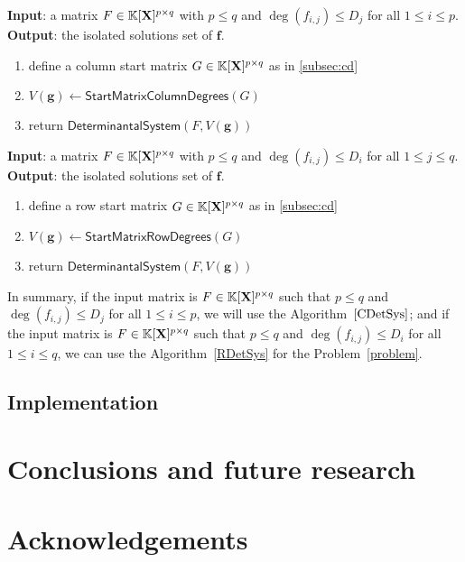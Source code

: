 \documentclass[11pt]{article}
\numberwithin{Property}{section}
\numberwithin{Theorem}{section}
\numberwithin{Proposition}{section}
\numberwithin{Lemma}{section}
\numberwithin{Corollary}{section}
\numberwithin{Definition}{section}
\numberwithin{Remark}{section}
\numberwithin{Conjecture}{section}
\numberwithin{Problem}{section}
\numberwithin{Claim}{section}
\theoremstyle{definition}
\numberwithin{Example}{section}
\def\f {\ensuremath{\mathbf{f}}}
\def\g {\ensuremath{\mathbf{g}}}
\renewcommand{\leq}{\leqslant}
\newcommand{\field}{\mathbb{K}} %
\newcommand{\mat}[1]{\mathbf{\MakeUppercase{#1}}} %
\begin{document}
\begin{algorithm}
\caption{$\mathsf{ColumnDeterminantal System}$}
\label{CDetSys}
{\bf Input}: a matrix $F \in \field[\mat{X}]^{p \times q}$ with $p \leq q$ and $\deg(f_{i,j}) \leq D_j$ for all $1 \leq i \leq p$.\\
{\bf Output}: the isolated solutions set of $\f$. 
\begin{enumerate}
\item define a column start matrix $G \in \field[\mat{X}]^{p \times q}$ as in \cref{subsec:cd}
\item $V(\g) \gets \mathsf{Start Matrix Column Degrees}(G)$
\item return $\mathsf{Determinantal System}(F, V(\g))$
\end{enumerate}
\end{algorithm}

\begin{algorithm}
\caption{$\mathsf{RowDeterminantal System}$}
\label{RDetSys}
{\bf Input}: a matrix $F \in \field[\mat{X}]^{p \times q}$ with $p \leq q$ and $\deg(f_{i,j}) \leq D_i$ for all $1 \leq j \leq q$.\\
{\bf Output}: the isolated solutions set of $\f$.
\begin{enumerate}
\item define a row start matrix $G \in \field[\mat{X}]^{p \times q}$ as in \cref{subsec:cd}
\item $V(\g) \gets \mathsf{Start Matrix Row Degrees}(G)$
\item return $\mathsf{Determinantal System}(F, V(\g))$
\end{enumerate}
\end{algorithm}
In summary, if the input matrix is $F \in \field[\mat{X}]^{p \times q}$ such that $p \leq q$ and $\deg(f_{i,j}) \leq D_j$ for all $1 \leq i \leq p$, we will use the Algorithm~$\ref{CDetSys}$; and if the input matrix is $F \in \field[\mat{X}]^{p \times q}$ such that $p \leq q$ and $\deg(f_{i,j}) \leq D_i$ for all $1 \leq i \leq q$, we can use the Algorithm~\ref{RDetSys} for the Problem~\ref{problem}. 
\subsection{Implementation}
\section{Conclusions and future research}
\label{sec:conclusion}
\section{Acknowledgements}
\newpage


\appendix
\end{document}
